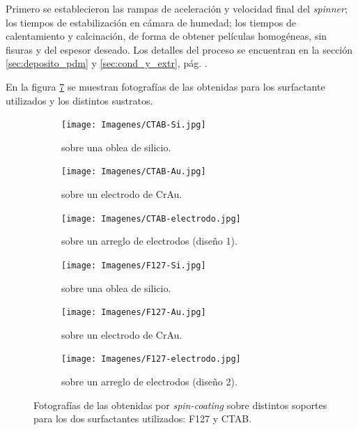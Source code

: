 		Primero se establecieron las rampas de aceleración y velocidad final del \textit{spinner}; los tiempos de estabilización en cámara de humedad; los tiempos de calentamiento y calcinación, de forma de obtener películas homogéneas, sin fisuras y del espesor deseado. Los detalles del proceso se encuentran en la sección \ref{sec:deposito_pdm} y \ref{sec:cond_y_extr}, pág. \pageref{sec:deposito_pdm}. 

		En la figura \ref{fig:fotos_films} se muestran fotografías de las \pdm\space obtenidas para los surfactante utilizados y los distintos sustratos. 

			\begin{figure}[th]
	 	   	    \begin{subfigure}[t]{0.325\textwidth}
		        	\texttt{[image: Imagenes/CTAB-Si.jpg]}
		       		\caption{\pdmC\space sobre una oblea de silicio.}
		         	\label{fig:F127_vidrio}
		     		\end{subfigure}
	     		\begin{subfigure}[t]{0.325\textwidth}
		        	\texttt{[image: Imagenes/CTAB-Au.jpg]}
		       		\caption{\pdmC\space sobre un electrodo de Cr\textbar Au.}
		         	\label{fig:F127_silicio}
		     		\end{subfigure}
	     		\begin{subfigure}[t]{0.325\textwidth}
		        	\texttt{[image: Imagenes/CTAB-electrodo.jpg]}
		       		\caption{\pdmC\space sobre un arreglo de electrodos (diseño 1).}
		         	\label{fig:F127_Au}
		     		\end{subfigure}
	 	   	    \begin{subfigure}[t]{0.325\textwidth}
		        	\texttt{[image: Imagenes/F127-Si.jpg]}
		       		\caption{\pdmF\space sobre una oblea de silicio.}
		         	\label{fig:CTAB_vidrio}
		     		\end{subfigure}
	     		\begin{subfigure}[t]{0.325\textwidth}
		        	\texttt{[image: Imagenes/F127-Au.jpg]}
		       		\caption{\pdmF\space sobre un electrodo de Cr\textbar Au.}
		         	\label{fig:CTAB_silicio}
		     		\end{subfigure}
	     		\begin{subfigure}[t]{0.325\textwidth}
		        	\texttt{[image: Imagenes/F127-electrodo.jpg]}
		       		\caption{\pdmF\space sobre un arreglo de electrodos (diseño 2).}
		         	\label{fig:CTAB_Au}
		     		\end{subfigure}
	     		\caption[Películas mesoporosas sobre distintos soportes.]{Fotografías de las \pdm\space obtenidas por \textit{spin-coating }sobre distintos soportes para los dos surfactantes utilizados: F127 y CTAB.}
	     		\label{fig:fotos_films}
	     	   	\end{figure}

